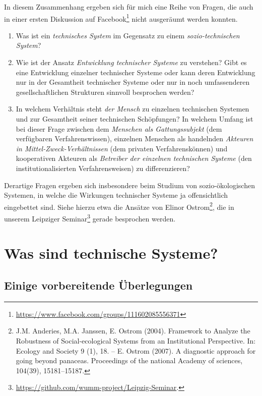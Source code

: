 \documentclass[11pt,a4paper]{article}
\begin{document}
In diesem Zusammenhang ergeben sich für mich eine Reihe von Fragen, die auch
in einer ersten Diskussion auf
Facebook\footnote{\url{https://www.facebook.com/groups/111602085556371}} nicht
ausgeräumt werden konnten.
\begin{enumerate}
\item Was ist ein \emph{technisches System} im Gegensatz zu einem
  \emph{sozio-technischen System}?
\item Wie ist der Ansatz \emph{Entwicklung technischer Systeme} zu verstehen?
  Gibt es eine Entwicklung einzelner technischer Systeme oder kann deren
  Entwicklung nur in der Gesamtheit technischer Systeme oder nur in noch
  umfassenderen gesellschaftlichen Strukturen sinnvoll besprochen werden?
\item In welchem Verhältnis steht \emph{der Mensch} zu einzelnen technischen
  Systemen und zur Gesamtheit seiner technischen Schöpfungen? In welchem
  Umfang ist bei dieser Frage zwischen dem \emph{Menschen als Gattungssubjekt}
  (dem verfügbaren Verfahrenswissen), einzelnen Menschen als handelnden
  \emph{Akteuren in Mittel-Zweck-Verhältnissen} (dem privaten
  Verfahrenskönnen) und kooperativen Akteuren als \emph{Betreiber der
    einzelnen technischen Systeme} (den institutionalisierten
  Verfahrensweisen) zu differenzieren?
\end{enumerate}

Derartige Fragen ergeben sich insbesondere beim Studium von sozio-ökologischen
Systemen, in welche die Wirkungen technischer Systeme ja offensichtlich
eingebettet sind.  Siehe hierzu etwa die Ansätze von Elinor
Ostrom\footnote{J.M. Anderies, M.A. Janssen, E. Ostrom (2004).  Framework to
  Analyze the Robustness of Social-ecological Systems from an Institutional
  Perspective. In: Ecology and Society 9 (1), 18. -- E. Ostrom (2007). A
  diagnostic approach for going beyond panaceas.  Proceedings of the national
  Academy of sciences, 104(39), 15181--15187.}, die in unserem Leipziger
Seminar\footnote{\url{https://github.com/wumm-project/Leipzig-Seminar}.}
gerade besprochen werden.

\section{Was sind technische Systeme?}

\subsection{Einige vorbereitende Überlegungen}
\end{document}
